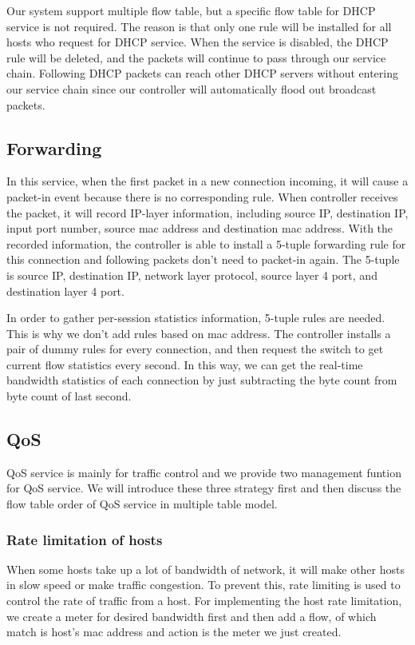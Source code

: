 \documentclass[journal]{IEEEtran}
\begin{document}
Our system support multiple flow table, but a specific flow table for DHCP service is not required.
The reason is that only one rule will be installed for all hosts who request for DHCP service.
When the service is disabled, the DHCP rule will be deleted,
and the packets will continue to pass through our service chain.
Following DHCP packets can reach other DHCP servers without entering our service chain
since our controller will automatically flood out broadcast packets.



\subsection{Forwarding} \label{ssec:forwarding}
In this service, when the first packet in a new connection incoming, it will cause a packet-in event because there is no corresponding rule. When controller receives the packet, it will record IP-layer information, including source IP, destination IP, input port number, source mac address and destination mac address. With the recorded information, the controller is able to install a 5-tuple forwarding rule for this connection and following packets don’t need to packet-in again. The 5-tuple is source IP, destination IP, network layer protocol, source layer 4 port, and destination layer 4 port.

In order to gather per-session statistics information, 5-tuple rules are needed. This is why we don’t add rules  based on mac address.  The controller installs a pair of dummy rules for every connection, and then request the switch to get current flow statistics every second. In this way, we can get the real-time bandwidth statistics of each connection by just subtracting the byte count from byte count of last second.



\subsection{QoS}
QoS service is mainly for traffic control and we provide two management funtion for QoS service. We will introduce these three strategy first and then discuss the flow table order of QoS service in multiple table model.

\subsubsection{Rate limitation of hosts}
When some hosts take up a lot of bandwidth of network, it will make other hosts in slow speed or make traffic congestion. To prevent this, rate limiting is used to control the rate of traffic from a host. For implementing the host rate limitation, we create a meter for desired bandwidth first and then add a flow, of which match is host’s mac address and action is the meter we just created.
\end{document}
